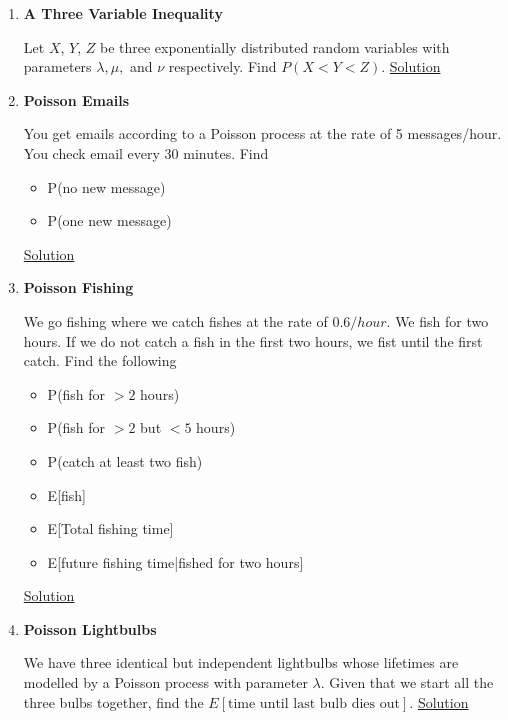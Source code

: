 \documentclass[11pt, a4paper]{article}
\begin{document}
\begin{enumerate}
    
    \item \hypertarget{q_threevar}{\textbf{A Three Variable Inequality}} \newline
    Let $X$, $Y$, $Z$ be three exponentially distributed random variables with parameters $\lambda, \mu,$ and $\nu$ respectively. Find $P(X < Y < Z)$. \hyperlink{a_threevar}{Solution}


    \item \hypertarget{q_poissonemails}{\textbf{Poisson Emails}}\newline
    You get emails according to a Poisson process at the rate of 5 messages/hour. You check email every 30 minutes. Find
    \begin{itemize}
        \item P(no new message)
        \item P(one new message)
    \end{itemize}
    \hyperlink{a_poissonemails}{Solution}

    \item \hypertarget{q_poissonfish}{\textbf{Poisson Fishing}}\newline
    We go fishing where we catch fishes at the rate of $0.6/hour$. We fish for two hours. If we do not catch a fish in the first two hours, we fist until the first catch. Find the following
    \begin{itemize}
        \item P(fish for $> 2$ hours)
        \item P(fish for $> 2$ but $< 5$ hours)
        \item P(catch at least two fish)
        \item E[fish]
        \item E[Total fishing time]
        \item E[future fishing time|fished for two hours]
    \end{itemize}
    \hyperlink{a_poissonfish}{Solution}

    \item \hypertarget{q_poissonbulb}{\textbf{Poisson Lightbulbs}}\newline
    We have three identical but independent lightbulbs whose lifetimes are modelled by a Poisson process with parameter $\lambda$. Given that we start all the three bulbs together, find the $E[\text{time until last bulb dies out}]$. \hyperlink{a_poissonbulb}{Solution}



\end{enumerate}
\end{document}
